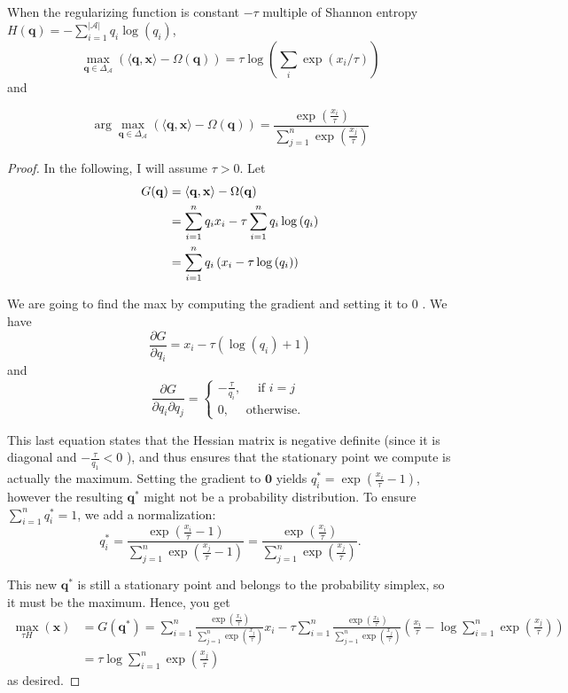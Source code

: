 \begin{lem}\label{lem:logsumexp_Shannon}
When the regularizing function is constant $-\tau$ multiple of Shannon entropy $H(\mathbf{q})=-\sum_{i=1}^{|\mathcal{A}|} q_i \log \left(q_i\right)$, $$\max _{\mathbf{q} \in \Delta_{\mathcal{A}}}\left(\langle\mathbf{q}, \mathbf{x}\rangle-\Omega(\mathbf{q})\right)=\tau \log \left(\sum_i \exp \left(x_i / \tau\right)\right)$$ and

$$\arg\max _{\mathbf{q} \in \Delta_{\mathcal{A}}}\left(\langle\mathbf{q}, \mathbf{x}\rangle-\Omega(\mathbf{q})\right)=\frac{\exp \left(\frac{x_i}{\tau}\right)}{\sum_{j=1}^n \exp \left(\frac{x_j}{\tau}\right)}$$
\end{lem}
\begin{proof}
    In the following, I will assume $\tau>0$. Let
\begin{align}
G(\mathbf{q})&=\langle\mathbf{q}, \mathbf{x}\rangle-\Omega(\mathbf{q})\notag
\\
&=\sum_{i=1}^n q_i x_i-\tau \sum_{i=1}^n q_i \log \left(q_i\right)
\notag
\\
&=\sum_{i=1}^n q_i \left(x_i-\tau \log \left(q_i\right)\right) \notag
\end{align}


We are going to find the max by computing the gradient and setting it to 0 . We have
$$
\frac{\partial G}{\partial q_i}=x_i-\tau\left(\log \left(q_i\right)+1\right)
$$
and
$$
\frac{\partial G}{\partial q_i \partial q_j}=\left\{\begin{array}{l}
-\frac{\tau}{q_i}, \quad \text { if } i=j \\
0, \quad \text { otherwise. }
\end{array}\right.
$$

This last equation states that the Hessian matrix is negative definite (since it is diagonal and $-\frac{\tau}{q_1}<0$ ), and thus ensures that the stationary point we compute is actually the maximum. Setting the gradient to $\mathbf{0}$ yields $q_i^*=\exp \left(\frac{x_i}{\tau}-1\right)$, however the resulting $\mathbf{q}^*$ might not be a probability distribution. To ensure $\sum_{i=1}^n q_i^*=1$, we add a normalization:
$$
q_i^*=\frac{\exp \left(\frac{x_i}{\tau}-1\right)}{\sum_{j=1}^n \exp \left(\frac{x_j}{\tau}-1\right)}=\frac{\exp \left(\frac{x_i}{\tau}\right)}{\sum_{j=1}^n \exp \left(\frac{x_j}{\tau}\right)} .
$$

This new $\mathbf{q}^*$ is still a stationary point and belongs to the probability simplex, so it must be the maximum. Hence, you get
$$
\begin{aligned}
\max _{\tau H}(\mathbf{x})& =G\left(\mathbf{q}^*\right)=\sum_{i=1}^n \frac{\exp \left(\frac{x_i}{\tau}\right)}{\sum_{j=1}^n \exp \left(\frac{x_j}{\tau}\right)} x_i-\tau \sum_{i=1}^n \frac{\exp \left(\frac{x_1}{\tau}\right)}{\sum_{j=1}^n \exp \left(\frac{x_j}{\tau}\right)}\left(\frac{x_i}{\tau}-\log \sum_{i=1}^n \exp \left(\frac{x_j}{\tau}\right)\right) \\
&= \tau \log \sum_{i=1}^n \exp \left(\frac{x_j}{\tau}\right)
\end{aligned}
$$
as desired.
\end{proof}





